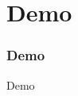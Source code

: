 \documentclass[british,10pt]{beamer}
\begin{document}
%
%

\section{Demo}
\begin{frame}\frametitle{Demo}
\centering
\Huge Demo
\end{frame}
\end{document}
